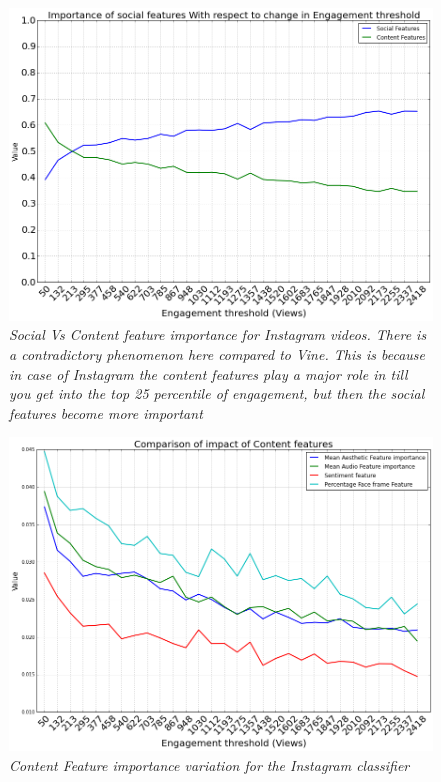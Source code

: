 \begin{figure}[!htb]
	\centering
	\includegraphics[width=\columnwidth]{plots/InstaSocialVsContent.png}
	\caption{\textsl{Social Vs Content feature importance for Instagram videos. There is a contradictory phenomenon here compared to Vine. This is because in case of Instagram the content features play a major role in till you get into the top 25 percentile of engagement, but then the social features become more important  }}
	\label{fig:Face_Thirds}
\end{figure}

\begin{figure}[!htb]
	\centering
	\includegraphics[width=\columnwidth]{plots/InstaContentComparison.png}
	\caption{\textsl{Content Feature importance variation for the Instagram classifier }}
	\label{fig:Face_Thirds}
\end{figure}

